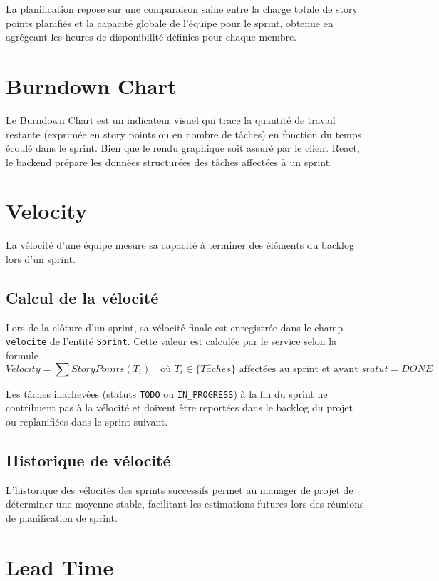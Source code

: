 \documentclass[12pt,a4paper]{report}
\begin{document}
La planification repose sur une comparaison saine entre la charge totale de story points planifiés et la capacité globale de l'équipe pour le sprint, obtenue en agrégeant les heures de disponibilité définies pour chaque membre.

\section{Burndown Chart}

Le Burndown Chart est un indicateur visuel qui trace la quantité de travail restante (exprimée en story points ou en nombre de tâches) en fonction du temps écoulé dans le sprint. Bien que le rendu graphique soit assuré par le client React, le backend prépare les données structurées des tâches affectées à un sprint.

\section{Velocity}

La vélocité d'une équipe mesure sa capacité à terminer des éléments du backlog lors d'un sprint.

\subsection{Calcul de la vélocité}

Lors de la clôture d'un sprint, sa vélocité finale est enregistrée dans le champ \verb|velocite| de l'entité \verb|Sprint|. Cette valeur est calculée par le service selon la formule :
$$Velocity = \sum StoryPoints(T_i) \quad \text{où } T_i \in \{T\hat{a}ches\} \text{ affectées au sprint et ayant } statut = DONE$$

Les tâches inachevées (statuts \verb|TODO| ou \verb|IN_PROGRESS|) à la fin du sprint ne contribuent pas à la vélocité et doivent être reportées dans le backlog du projet ou replanifiées dans le sprint suivant.

\subsection{Historique de vélocité}

L'historique des vélocités des sprints successifs permet au manager de projet de déterminer une moyenne stable, facilitant les estimations futures lors des réunions de planification de sprint.

\section{Lead Time}
\end{document}
